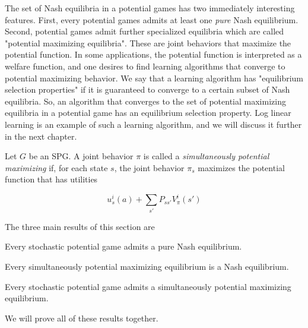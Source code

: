 The set of Nash equilibria in a potential games has two immediately interesting features. First, every potential games admits at least one {\em pure} Nash equilibrium. Second, potential games admit further specialized equilibria which are called "potential maximizing equilibria". These are joint behaviors that maximize the potential function. In some applications, the potential function is interpreted as a welfare function, and one desires to find learning algorithms that converge to potential maximizing behavior. We say that a learning algorithm has "equilibrium selection properties" if it is guaranteed to converge to a certain subset of Nash equilibria. So, an algorithm that converges to the set of potential maximizing equilibria in a potential game has an equilibrium selection property. Log linear learning \cite{marden2012revisiting, young1993evolution} is an example of such a learning algorithm, and we will discuss it further in the next chapter.

\begin{mydef}

Let $G$ be an SPG. A joint behavior $\pi$ is called a {\em simultaneously potential maximizing} if, for each state $s$, the joint behavior $\pi_s$ maximizes the potential function that has utilities

\begin{equation}
    u^i_s(a) + \sum_{s'} P_{ss'} V^i_{\pi}(s')
\end{equation}

\end{mydef}


The three main results of this section are

\begin{thm}
Every stochastic potential game admits a pure Nash equilibrium.
\end{thm}

\begin{thm}
Every simultaneously potential maximizing equilibrium is a Nash equilibrium.
\end{thm}

\begin{thm}
Every stochastic potential game admits a simultaneously potential maximizing equilibrium.
\end{thm}

We will prove all of these results together.

